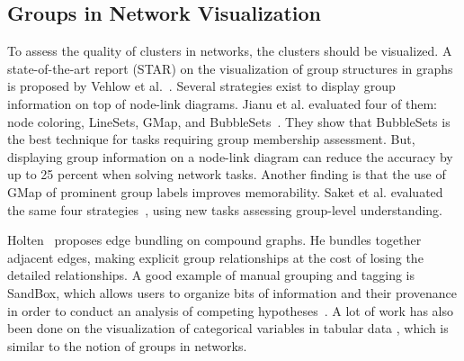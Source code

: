 \subsection{Groups in Network Visualization}

To assess the quality of clusters in networks, the clusters should be visualized.
A state-of-the-art report (STAR) on the visualization of group structures in graphs is proposed by Vehlow et al.~\cite{EVstar.groupstructures15}.
Several strategies exist to display group information on top of node-link diagrams. Jianu et al. evaluated four of them: node coloring, LineSets, GMap, and BubbleSets~\cite{jianuHowDisplayGroup2014}. They show that BubbleSets is the best technique for tasks requiring group membership assessment.
But, displaying group information on a node-link diagram can reduce the accuracy by up to 25 percent when solving network tasks.
Another finding is that the use of GMap of prominent group labels improves memorability. Saket et al. evaluated the same four strategies~\cite{Saket14}, using new tasks assessing group-level understanding.

Holten~\cite{holtenHierarchicalEdgeBundles2006} proposes edge bundling on compound graphs. He bundles together adjacent edges, making explicit group relationships at the cost of losing the detailed relationships.
A good example of manual grouping and tagging is SandBox, which allows users to organize bits of information and their provenance in order to conduct an analysis of competing hypotheses~\cite{wrightSandboxAnalysisConcepts2006}. A lot of work has also been done on the visualization of categorical variables in tabular data \cite{kosaraParallelSetsInteractive2006, gratzlDominoExtractingComparing2014}, which is similar to the notion of groups in networks.




